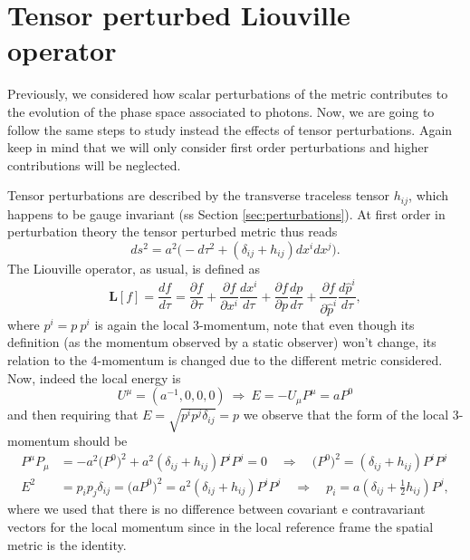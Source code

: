 \section{Tensor perturbed Liouville operator}\label{app:tensorPerturbedLiouvilleOperator}
Previously, we considered how scalar perturbations of the metric  contributes to the evolution of the phase space associated to photons. Now, we are going to follow the same steps to study instead the effects of tensor perturbations. Again keep in mind that we will only consider first order perturbations and higher contributions will be neglected.

Tensor perturbations are described by the transverse traceless tensor $h_{ij}$, which happens to be gauge invariant (ss Section \ref{sec:perturbations}). At first order in perturbation theory the tensor perturbed metric thus reads 
$$ds^2=a^2\Big(-d\tau^2+(\delta_{ij}+h_{ij})dx^idx^j\Big).$$
The Liouville operator, as usual, is defined as
$$\hat{\mathbf{L}}[f]=\frac{df}{d\tau}=\frac{\partial f}{\partial \tau}+\frac{\partial f}{\partial x^i}\frac{d x^i}{d\tau}+\frac{\partial f}{\partial p}\frac{d p}{d\tau}+\frac{\partial f}{\partial \hat p^i}\frac{d \hat p^i}{d\tau},$$
where $p^i=p\ p^i$ is again the local 3-momentum, note that even though its definition (as the momentum observed by a static observer) won't change, its relation to the 4-momentum is changed due to the different metric considered. Now, indeed the local energy is
$$U^\mu=(a^{-1},0,0,0)\ \Rightarrow\ E=-U_\mu P^\mu= aP^0$$
and then requiring that $E=\sqrt{p^ip^j\delta_{ij}}=p$ we observe that the form of the local 3-momentum should be
\begin{align*}
    P^\mu P_\mu&=-a^2\big(P^0\big)^2+a^2(\delta_{ij}+h_{ij})P^iP^j=0\quad\Rightarrow \quad\boxed{\big(P^0\big)^2=(\delta_{ij}+h_{ij})P^iP^j}\\E^2&=p_ip_j\delta_{ij}=\big(aP^0\big)^2=a^2(\delta_{ij}+h_{ij})P^iP^j\quad\Rightarrow \quad \boxed{p_i=a(\delta_{ij}+\frac{1}{2}h_{ij})P^j},
\end{align*} 
where we used that there is no difference between covariant e contravariant vectors for the local momentum since in the local reference frame the spatial metric is the identity.

